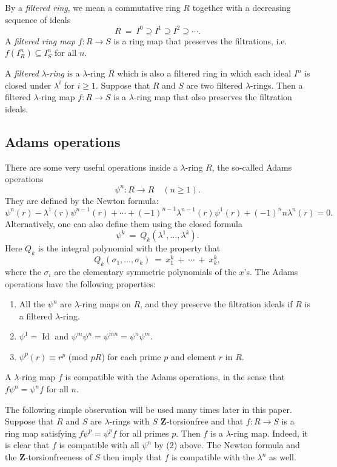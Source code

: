 \documentclass[reqno,11pt]{amsart}
\numberwithin{equation}{subsection}  %
\newcommand{\bZ}{\mathbf{Z}}
\DeclareMathOperator{\Id}{Id}
\begin{document}
By a \emph{filtered ring}, we mean a commutative ring $R$ together with a decreasing sequence of ideals
   \[ 
   R ~=~ I^0 \supseteq I^1 \supseteq I^2 \supseteq \cdots.
   \]
A \emph{filtered ring map} $f \colon R \to S$ is a ring map that preserves the filtrations, i.e.\ $f(I^n_R) \subseteq I^n_S$ for all $n$.


A \emph{filtered} $\lambda$-\emph{ring} is a $\lambda$-ring $R$ which is also a filtered ring in which each ideal $I^n$ is closed under $\lambda^i$ for $i \geq 1$.  Suppose that $R$ and $S$ are two filtered $\lambda$-rings.  Then a filtered $\lambda$-ring map $f \colon R \to S$ is a $\lambda$-ring map that also preserves the filtration ideals.



\subsection{Adams operations}
\label{subsec:adams}

There are some very useful operations inside a $\lambda$-ring $R$, the so-called Adams operations
   \[
   \psi^n \colon R \to R \quad (n \geq 1).
   \]
They are defined by the Newton formula:
   \[
   \psi^n(r) - \lambda^1(r)\psi^{n-1}(r) + \cdots + (-1)^{n-1}\lambda^{n-1}(r) \psi^1(r) + (-1)^n n\lambda^n(r) = 0.
   \]
Alternatively, one can also define them using the closed formula
   \[
   \psi^k ~=~ Q_k(\lambda^1, \ldots, \lambda^k).
   \]
Here $Q_k$ is the integral polynomial with the property that 
   \[
   Q_k(\sigma_1, \ldots, \sigma_k) 
   ~=~ x_1^k ~+~ \cdots ~+~ x_k^k,
   \]
where the $\sigma_i$ are the elementary symmetric polynomials of the $x$'s.  The Adams operations have the following properties:
\begin{enumerate}
\label{adams}
\item All the $\psi^n$ are $\lambda$-ring maps on $R$, and they preserve the filtration ideals if $R$ is a filtered $\lambda$-ring.
\item $\psi^1 = \Id$ and $\psi^m \psi^n = \psi^{mn} = \psi^n \psi^m$.
\item $\psi^p(r) \equiv r^p$ (mod $pR$) for each prime $p$ and element $r$ in $R$.
\end{enumerate}
A $\lambda$-ring map $f$ is compatible with the Adams operations, in the sense that $f\psi^n = \psi^n f$ for all $n$.


The following simple observation will be used many times later in this paper.  Suppose that $R$ and $S$ are $\lambda$-rings with $S$ $\bZ$-torsionfree and that $f \colon R \to S$ is a ring map satisfying $f\psi^p = \psi^pf$ for all primes $p$.  Then $f$ is a $\lambda$-ring map.  Indeed, it is clear that $f$ is compatible with all $\psi^n$ by (2) above.  The Newton formula and the $\bZ$-torsionfreeness of $S$ then imply that $f$ is compatible with the $\lambda^n$ as well.
\end{document}
